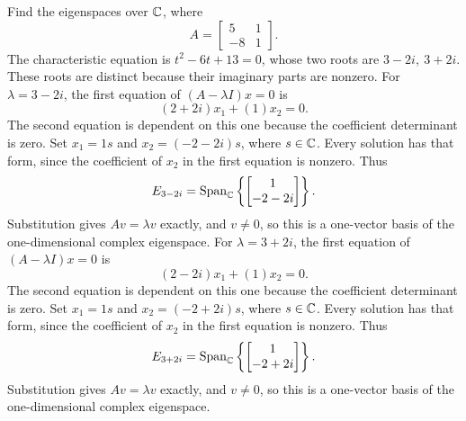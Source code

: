 \goal Find the eigenspaces over $\mathbb{C}$, where
\[A=\begin{bmatrix}5&1\\-8&1\end{bmatrix}.\]
The characteristic equation is $t^{2} - 6 t + 13=0$, whose two roots are $3 - 2 i,\ 3 + 2 i$. These roots are distinct because their imaginary parts are nonzero.
For $\lambda=3 - 2 i$, the first equation of $(A-\lambda I)x=0$ is
\[(2 + 2 i)x_1+(1)x_2=0.\]
The second equation is dependent on this one because the coefficient determinant is zero. Set $x_1=1s$ and $x_2=(-2 - 2 i)s$, where $s\in\mathbb{C}$. Every solution has that form, since the coefficient of $x_2$ in the first equation is nonzero. Thus
\[E_{3 - 2 i}=\operatorname{Span}_{\mathbb{C}}\left\{\begin{bmatrix}1\\-2 - 2 i\end{bmatrix}\right\}.\]
Substitution gives $Av=\lambda v$ exactly, and $v\ne0$, so this is a one-vector basis of the one-dimensional complex eigenspace.
For $\lambda=3 + 2 i$, the first equation of $(A-\lambda I)x=0$ is
\[(2 - 2 i)x_1+(1)x_2=0.\]
The second equation is dependent on this one because the coefficient determinant is zero. Set $x_1=1s$ and $x_2=(-2 + 2 i)s$, where $s\in\mathbb{C}$. Every solution has that form, since the coefficient of $x_2$ in the first equation is nonzero. Thus
\[E_{3 + 2 i}=\operatorname{Span}_{\mathbb{C}}\left\{\begin{bmatrix}1\\-2 + 2 i\end{bmatrix}\right\}.\]
Substitution gives $Av=\lambda v$ exactly, and $v\ne0$, so this is a one-vector basis of the one-dimensional complex eigenspace.


